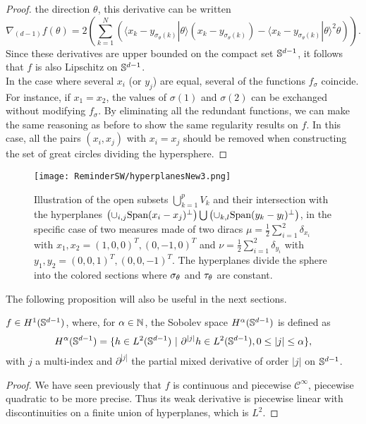 \begin{proof}
the direction
$\theta$, this derivative can be written
{\begin{equation}
  \nabla_{(d-1)} f (\theta) = 2 \left( \sum_{k = 1}^{N} \left( \langle x_{k} -
  y_{\sigma_\theta(k)} | \theta \rangle(x_{k} - y_{\sigma_\theta(k)} ) 
  -     \langle x_{k} -
  y_{\sigma_\theta(k)} | \theta \rangle ^2 \theta\right)\right).
  \label{eq:fderivative}
\end{equation}}
Since these derivatives are upper bounded on the compact set $\mathbb{S}^{d-1}$, it
follows that $f$ is also Lipschitz on  $\mathbb{S}^{d-1}$.\\
In the case where several $x_i$ (or $y_j$)  are equal,
several of the functions $f_\sigma$ coincide.  For instance, if $x_1 =
x_2$, the values of $\sigma(1)$ and $\sigma(2)$ can be exchanged
without modifying $f_\sigma$. By eliminating all the redundant
functions, we can make the same reasoning as before to show the same
regularity results on $f$.  In this case, all the pairs $(x_i,x_j)$
with $x_i = x_j$ should be
removed when constructing the set of great circles dividing the hypersphere.
\end{proof}


\begin{figure}[!h]
\begin{center}
\texttt{[image: ReminderSW/hyperplanesNew3.png]}
\caption{Illustration of the open subsets $\bigcup_{k=1}^p V_k$ and their intersection with the hyperplanes  $\left(\cup_{i,j} \text{Span}(x_i - x_j)^{\perp} \right)\bigcup \left(\cup_{k,l}\text{Span}(y_k -
y_l)^{\perp}\right)$, in the specific case of two measures made of two diracs 
{$\mu = \displaystyle\frac{1}{2} \sum\limits_{i = 1}^2 \delta_{x_i}$ with $ 
x_1,x_2 = (1,0,0)^T, (0,-1,0)^T$ and $\nu = 
\displaystyle\frac{1}{2}\sum\limits_{i = 1}^2 \delta_{y_i} $ with $y_1,y_2 = 
(0,0,1)^T,(0,0,-1)^T$}. The hyperplanes divide the sphere into the colored 
sections where $\sigma_{\theta}$ and $\tau_{\theta}$ are constant. 
}
\label{fig:hyperplanes}
\end{center}
\end{figure}

\noindent The following proposition will also be useful in the next sections.
\begin{Prop} \label{prop:Sobol}
  $f \in H^{1}(\mathbb{S}^{d-1})$, where, for $\alpha\in\mathbb{N}$, the Sobolev space $H^{\alpha}(\mathbb{S}^{d-1})$ is defined as~\citep{Hebey1996} 
  \[H^{\alpha}(\Sd) = \{ h\in L^2(\Sd)\ |\ \partial^{|j|}h\in L^2(\Sd), 0 \leq |j| \leq \alpha\},\]
with $j$ a multi-index and $\partial^{|j|}$ the partial mixed derivative of order $|j|$ on $\mathbb{S}^{d-1}$.
  \end{Prop}
  \begin{proof}
  We have seen previously that $f$ is continuous and piecewise $\mathcal{C}^{\infty}$, piecewise quadratic to be more precise. Thus its weak derivative is piecewise linear with discontinuities on a finite union of hyperplanes, which is $L^2$.
  \end{proof}


